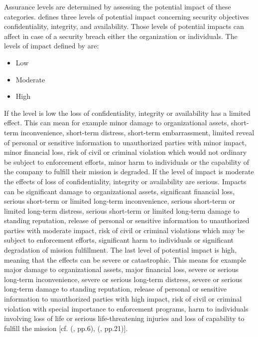 Assurance levels are determined by assessing the potential impact of these categories. \cite{NIST:2004:FIOPS} defines three levels of potential impact concerning security objectives confidentiality, integrity, and availability. Those levels of potential impacts can affect in case of a security breach either the organization or individuals. The levels of impact defined by \cite{NIST:2004:FIOPS} are:

\begin{itemize}
	\item Low
	\item Moderate
	\item High
\end{itemize}


If the level is low the loss of confidentiality, integrity or availability has a limited effect. This can mean for example minor damage to organizational assets, short-term inconvenience, short-term distress, short-term embarrassment, limited reveal of personal or sensitive information to unauthorized parties with minor impact, minor financial loss, risk of civil or criminal violation which would not ordinary be subject to enforcement efforts, minor harm to individuals or the capability of the company to fulfill their mission is degraded. If the level of impact is moderate the effects of loss of confidentiality, integrity or availability are serious. Impacts can be significant damage to organizational assets, significant financial loss, serious short-term or limited long-term inconvenience,  serious short-term or limited long-term distress,  serious short-term or limited long-term damage to standing reputation, release of personal or sensitive information to unauthorized parties with moderate impact, risk of civil or criminal violations which may be subject to enforcement efforts, significant harm to individuals or significant degradation of mission fulfillment. The last level of potential impact is high, meaning that the effects can be severe or catastrophic. This means for example major damage to organizational assets, major financial loss, severe or serious long-term inconvenience, severe or serious long-term distress, severe or serious long-term damage to standing reputation, release of personal or sensitive information to unauthorized parties with high impact, risk of civil or criminal violation with special importance to enforcement programs, harm to individuals involving loss of life or serious life-threatening injuries and loss of capability to fulfill the mission [cf. (\cite{NIST:2004:FIOPS}, pp.6), (\cite{NIST:2017:DIG}, pp.21)].


